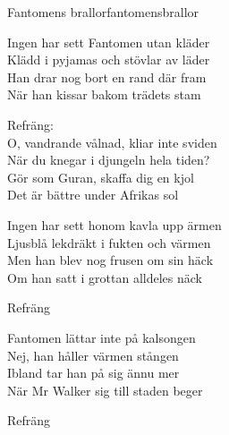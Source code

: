 \begin{song}{Fantomens brallor}{fantomensbrallor}
\begin{vers}
Ingen har sett Fantomen utan kläder\\
Klädd i pyjamas och stövlar av läder\\
Han drar nog bort en rand där fram\\
När han kissar bakom trädets stam\\
\end{vers}
\begin{vers}
Refräng:\\
O, vandrande vålnad, kliar inte sviden\\
När du knegar i djungeln hela tiden?\\
Gör som Guran, skaffa dig en kjol\\
Det är bättre under Afrikas sol\\
\end{vers}
\begin{vers}
Ingen har sett honom kavla upp ärmen\\
Ljusblå lekdräkt i fukten och värmen\\
Men han blev nog frusen om sin häck\\
Om han satt i grottan alldeles näck\\
\end{vers}
\begin{vers}
Refräng\\
\end{vers}
\begin{vers}
Fantomen lättar inte på kalsongen\\
Nej, han håller värmen stången\\
Ibland tar han på sig ännu mer\\
När Mr Walker sig till staden beger\\
\end{vers}
\begin{vers}
Refräng\\
\end{vers}
\end{song}
